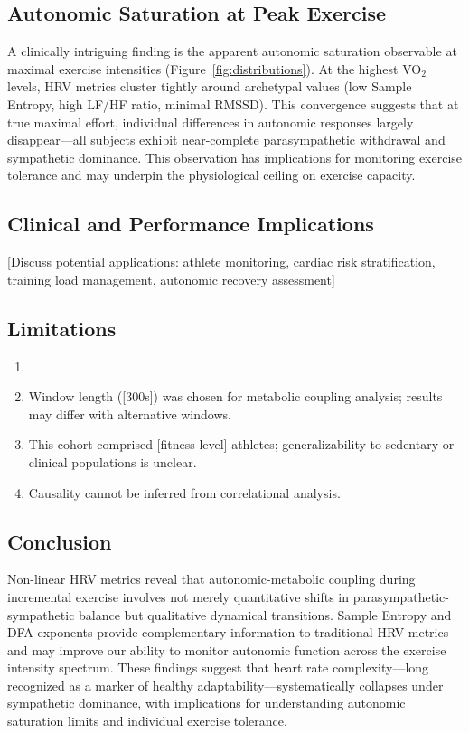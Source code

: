 \documentclass[12pt,a4paper]{article}
\begin{document}
\subsection*{Autonomic Saturation at Peak Exercise}

A clinically intriguing finding is the apparent autonomic saturation observable at maximal exercise intensities (Figure~\ref{fig:distributions}). At the highest VO$_2$ levels, HRV metrics cluster tightly around archetypal values (low Sample Entropy, high LF/HF ratio, minimal RMSSD). This convergence suggests that at true maximal effort, individual differences in autonomic responses largely disappear—all subjects exhibit near-complete parasympathetic withdrawal and sympathetic dominance. This observation has implications for monitoring exercise tolerance and may underpin the physiological ceiling on exercise capacity.

\subsection*{Clinical and Performance Implications}

[Discuss potential applications: athlete monitoring, cardiac risk stratification, training load management, autonomic recovery assessment]

\subsection*{Limitations}

\begin{enumerate}
    \item [List specific methodological limitations: sample size, gender/age composition, single-occasion testing, equipment constraints, etc.]
    \item Window length ([300s]) was chosen for metabolic coupling analysis; results may differ with alternative windows.
    \item This cohort comprised [fitness level] athletes; generalizability to sedentary or clinical populations is unclear.
    \item Causality cannot be inferred from correlational analysis.
\end{enumerate}

\subsection*{Conclusion}

Non-linear HRV metrics reveal that autonomic-metabolic coupling during incremental exercise involves not merely quantitative shifts in parasympathetic-sympathetic balance but qualitative dynamical transitions. Sample Entropy and DFA exponents provide complementary information to traditional HRV metrics and may improve our ability to monitor autonomic function across the exercise intensity spectrum. These findings suggest that heart rate complexity—long recognized as a marker of healthy adaptability—systematically collapses under sympathetic dominance, with implications for understanding autonomic saturation limits and individual exercise tolerance.
\end{document}
